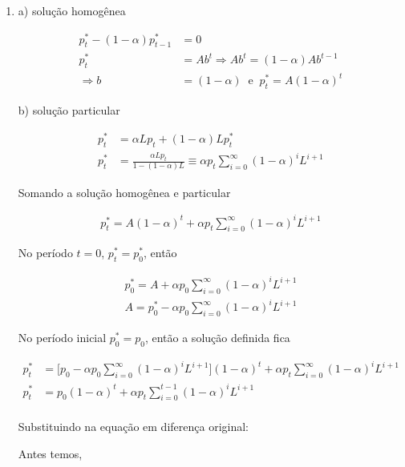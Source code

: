 \begin{enumerate}
	------------------------------------
	
	\item a) solução homogênea
	
	\begin{align*}
		p^*_t-(1-\alpha)p^*_{t-1}&=0\\
		 p^*_t&=Ab^t\Rightarrow Ab^t=(1-\alpha)Ab^{t-1}\\
		\Rightarrow b&=(1-\alpha)\; \;\text{e}\;\; p_t^*=A(1-\alpha)^t
	\end{align*}
	
	b) solução particular
	
	 \begin{align*}
		p_t^*&=\alpha Lp_t +(1-\alpha)Lp_t^*\\
		p_t^*&=\frac{\alpha Lp_t}{1-(1-\alpha)L}\equiv \alpha p_t \sum \limits_{i=0}^{\infty}(1-\alpha)^iL^{i+1}
		\end{align*}
		
		Somando a solução homogênea e particular
		
		\begin{align*}
			p^*_t=A(1-\alpha)^t+ \alpha p_t \sum \limits_{i=0}^{\infty}(1-\alpha)^iL^{i+1}
		\end{align*}
		
		No período $t=0$, $p_t^*=p_0^*$, então
		
		\begin{align*}
			p_0^*=A+\alpha p_0 \sum \limits_{i=0}^{\infty}(1-\alpha)^iL^{i+1}\\
			A=p_0^*-\alpha p_0\sum \limits_{i=0}^{\infty}(1-\alpha)^iL^{i+1}
		\end{align*}
		
		No período inicial $p_0^*=p_0$, então a solução definida fica
		
		\begin{align*}
			p^*_t&=\Bigg[p_0-\alpha p_0\sum \limits_{i=0}^{\infty}(1-\alpha)^iL^{i+1}\Bigg](1-\alpha)^t+ \alpha p_t \sum \limits_{i=0}^{\infty}(1-\alpha)^iL^{i+1}\\
			p^*_t&=p_0(1-\alpha)^t+ \alpha p_t \sum \limits_{i=0}^{t-1}(1-\alpha)^iL^{i+1}\\
		\end{align*}
	
	Substituindo na equação em diferença original:
	
	Antes temos,
	

\end{enumerate}
